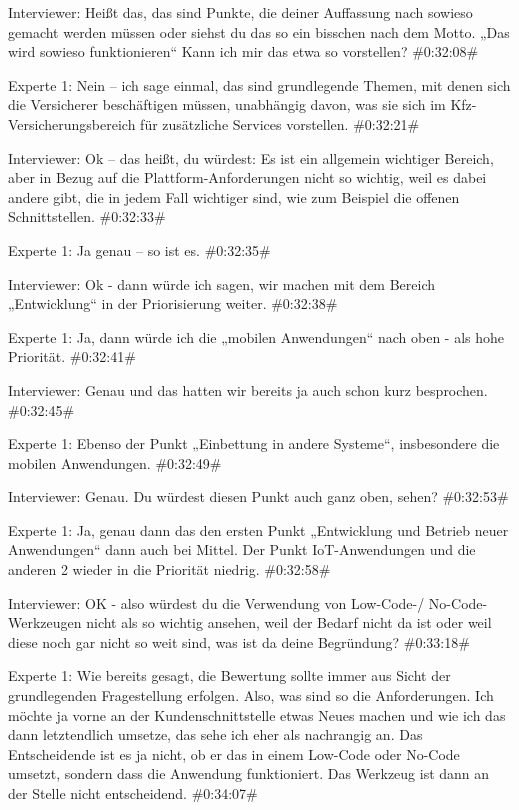 Interviewer:
Heißt das, das sind Punkte, die deiner Auffassung nach sowieso gemacht werden müssen oder siehst du das so ein bisschen nach dem Motto. „Das wird sowieso funktionieren“ Kann ich mir das etwa so vorstellen?
\#0:32:08\#

Experte 1:
Nein – ich sage einmal, das sind grundlegende Themen, mit denen sich die Versicherer beschäftigen müssen, unabhängig davon, was sie sich im Kfz-Versicherungsbereich für zusätzliche Services vorstellen.
\#0:32:21\#

Interviewer:
Ok – das heißt, du würdest: Es ist ein allgemein wichtiger Bereich, aber in Bezug auf die Plattform-Anforderungen nicht so wichtig, weil es dabei andere gibt, die in jedem Fall wichtiger sind, wie zum Beispiel die offenen Schnittstellen.
\#0:32:33\#

Experte 1:
Ja genau – so ist es.
\#0:32:35\#

Interviewer:
Ok - dann würde ich sagen, wir machen mit dem Bereich „Entwicklung“ in der Priorisierung weiter.
\#0:32:38\#

Experte 1:
Ja, dann würde ich die „mobilen Anwendungen“ nach oben - als hohe Priorität.
\#0:32:41\#

Interviewer:
Genau und das hatten wir bereits ja auch schon kurz besprochen.
\#0:32:45\#

Experte 1:
Ebenso der Punkt „Einbettung in andere Systeme“, insbesondere die mobilen Anwendungen.
\#0:32:49\#

Interviewer:
Genau. Du würdest diesen Punkt auch ganz oben, sehen?
\#0:32:53\#

Experte 1:
Ja, genau dann das den ersten Punkt „Entwicklung und Betrieb neuer Anwendungen“ dann auch bei Mittel. Der Punkt IoT-Anwendungen und die anderen 2 wieder in die Priorität niedrig.
\#0:32:58\#

Interviewer:
OK - also würdest du die Verwendung von Low-Code-/ No-Code-Werkzeugen nicht als so wichtig ansehen, weil der Bedarf nicht da ist oder weil diese noch gar nicht so weit sind, was ist da deine Begründung?
\#0:33:18\#

Experte 1:
Wie bereits gesagt, die Bewertung sollte immer aus Sicht der grundlegenden Fragestellung erfolgen. Also, was sind so die Anforderungen. Ich möchte ja vorne an der Kundenschnittstelle etwas Neues machen und wie ich das dann letztendlich umsetze, das sehe ich eher als nachrangig an. Das Entscheidende ist es ja nicht, ob er das in einem Low-Code oder No-Code umsetzt, sondern dass die Anwendung funktioniert. Das Werkzeug ist dann an der Stelle nicht entscheidend.
\#0:34:07\#

